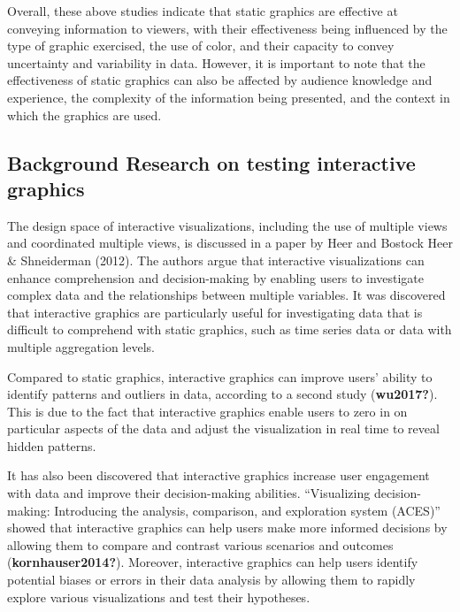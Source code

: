 \documentclass[print]{nuthesis}
\begin{document}
Overall, these above studies indicate that static graphics are effective at conveying information to viewers, with their effectiveness being influenced by the type of graphic exercised, the use of color, and their capacity to convey uncertainty and variability in data.
However, it is important to note that the effectiveness of static graphics can also be affected by audience knowledge and experience, the complexity of the information being presented, and the context in which the graphics are used.

\hypertarget{background-research-on-testing-interactive-graphics}{%
\subsection{Background Research on testing interactive graphics}\label{background-research-on-testing-interactive-graphics}}

The design space of interactive visualizations, including the use of multiple views and coordinated multiple views, is discussed in a paper by Heer and Bostock Heer \& Shneiderman (2012).
The authors argue that interactive visualizations can enhance comprehension and decision-making by enabling users to investigate complex data and the relationships between multiple variables.
It was discovered that interactive graphics are particularly useful for investigating data that is difficult to comprehend with static graphics, such as time series data or data with multiple aggregation levels.

Compared to static graphics, interactive graphics can improve users' ability to identify patterns and outliers in data, according to a second study (\textbf{wu2017?}).
This is due to the fact that interactive graphics enable users to zero in on particular aspects of the data and adjust the visualization in real time to reveal hidden patterns.

It has also been discovered that interactive graphics increase user engagement with data and improve their decision-making abilities.
``Visualizing decision-making: Introducing the analysis, comparison, and exploration system (ACES)'' showed that interactive graphics can help users make more informed decisions by allowing them to compare and contrast various scenarios and outcomes (\textbf{kornhauser2014?}).
Moreover, interactive graphics can help users identify potential biases or errors in their data analysis by allowing them to rapidly explore various visualizations and test their hypotheses.
\end{document}
